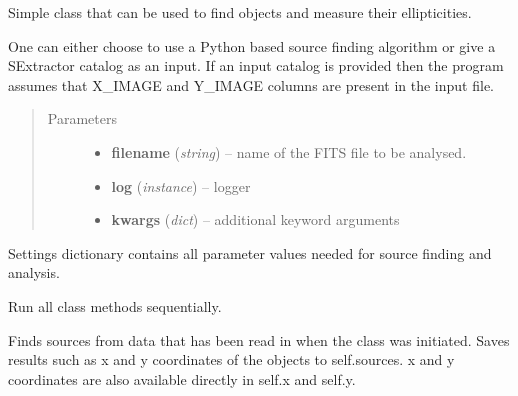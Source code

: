\documentclass[a4paper,12pt,english]{sphinxmanual}
\begin{document}
\begin{fulllineitems}
\label{analysis:analysis.analyse.analyseVISdata}
Simple class that can be used to find objects and measure their ellipticities.

One can either choose to use a Python based source finding algorithm or
give a SExtractor catalog as an input. If an input catalog is provided
then the program assumes that X\_IMAGE and Y\_IMAGE columns are present
in the input file.
\begin{quote}\begin{description}
\item[{Parameters}] \leavevmode\begin{itemize}
\item {} 
\textbf{filename} (\emph{string}) -- name of the FITS file to be analysed.

\item {} 
\textbf{log} (\emph{instance}) -- logger

\item {} 
\textbf{kwargs} (\emph{dict}) -- additional keyword arguments

\end{itemize}

\end{description}\end{quote}

Settings dictionary contains all parameter values needed
for source finding and analysis.

\begin{fulllineitems}
\label{analysis:analysis.analyse.analyseVISdata.doAll}
Run all class methods sequentially.

\end{fulllineitems}


\begin{fulllineitems}
\label{analysis:analysis.analyse.analyseVISdata.findSources}
Finds sources from data that has been read in when the class was initiated.
Saves results such as x and y coordinates of the objects to self.sources.
x and y coordinates are also available directly in self.x and self.y.


\end{fulllineitems}
\end{fulllineitems}
\end{document}
